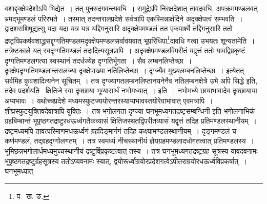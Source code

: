 \documentclass[11pt, openany]{book}
\begin{document}
\noindent वशाद्दृक्क्षेपदेशोऽपि भिद्येत~। तत् पुनरुदगवन्त्यवधि~। समुद्रेऽपि निरक्षदेशात् तावदवधि, अपक्रममण्डलवत् भ्रमद्भूमण्डलं परिरभते~। तस्मात् तदन्तरालप्रदेशे सर्वत्रापि एकस्मिन्नार्क्षदिने अदृक्क्षेपत्वं सम्भवति~। द्वादशराशिषूद्यत्सु यदा यदा यत्र यत्र यद्दिगनुसारि 
अदृक्क्षेपमण्डलं तत एकपार्श्वे तद्दिगनुसारि ततो द्रष्टृविप्रकर्षवशाद्ध्रसद्दृग्गतिमण्डलमदृक्क्षेपमण्डलसर्वावयवात् भूपरिधिपा\renewcommand{\thefootnote}{१}\footnote{प \textendash\ ख. ङ.}दावधि गत्वा 
उभयतः शून्यतामेति~। तत्रेष्टकाले यत् स्वदृग्गतिमण्डलं तदादित्यसूत्रप्रापि~। अदृक्क्षेपमण्डलविपरीतं यद्वृत्तं ततो यावद्विप्रकृष्टं
दृग्गतिमण्डलगत्या स्वस्थानं तदर्धज्येह दृग्गतिर्भूगता~। सैव लम्बनलिप्तेच्छा~। दृक्क्षेपदृग्गतिमण्डलान्तरालज्या दृक्क्षेपाख्या नतिलिप्तेच्छा~। दृग्ज्यैव मुख्यलम्बनलिप्तेच्छा~। इत्येतत् सर्वमिह कुवशादित्यनेन सूचितम्~। तत्र दृग्ज्यागतलम्बनलिप्तानयनेनैव नतिलम्बनक्षेत्रे उभे अपि सिद्धे
इति, तदेव प्रदर्शयति \textendash\ {\qt क्षितिजे स्वा दृक्छाया भूव्यासार्धं नभोमध्यात्~।} इति~। नभोमध्ये छायाभावादेव दृक्छायाया अप्यभावः~। यथोच्चप्रदेशे मध्यमस्फुटज्ययोरन्तरस्याप्यभावस्तयोरेवाभावात् एवमत्रापि~। शीघ्रस्फुटयुक्तिवदेवात्रापि युक्तिः~। तत्र भगोलगता दृग्ज्या घनभूमध्यगतद्रष्टृसम्बन्धिनी इति भगोलनाभिकं ग्रहबिम्बान्तं भूपृष्ठगतद्रष्टुरधऊर्ध्वगतैकव्यासं क्षितिजस्थतद्विपरीतव्यासं यद्वृत्तं तदिह प्रतिमण्डलस्थानीयम्~। द्रष्टृमध्यमपि तावत्परिमाणमधऊर्ध्वगं ग्रहदिङ्मार्गगं तदिह कक्ष्यामण्डलस्थानीयम्~। दृङ्गमण्डलं च कर्णमण्डलं, तद्ग्रहदृग्गोलगतम्~। तत्र स्वमध्यं नीचस्थानीयं ज्ञेयग्रहमण्डलादधोगतत्वात् प्रतिमण्डलस्य~। भूमिछन्नभगोलार्धमध्यमुच्चस्थानीयं द्रष्टुर्विप्रकृष्टत्वात् तस्य~। तत्र घनभूमध्यगतद्रष्टृग्रह सूत्रस्य यावदवनामः भूपृष्ठगतद्रष्टुर्ग्रहसूत्रस्य ततोऽप्यवनामः स्यात्, 
द्वयोरूर्ध्वाग्रयोरप्रदेशगत्वेऽपीतराग्रयोरधऊर्ध्वविप्रकर्षात्~। घनभूमध्यात् 

\newpage
\end{document}
